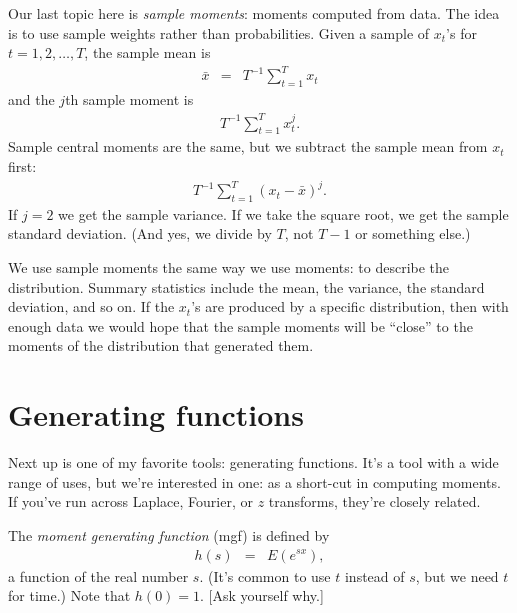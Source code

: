 Our last topic here is {\it sample moments\/}:
moments computed from data.
The idea is to use sample weights rather than probabilities.
Given a sample of $x_t$'s for $t=1,2,\ldots,T$,
the sample mean is
\begin{eqnarray*}
         \bar{x} &=& T^{-1} \sum_{t=1}^T x_t
\end{eqnarray*}
and the $j$th sample moment is
\begin{eqnarray*}
         T^{-1} \sum_{t=1}^T x_t^j .
\end{eqnarray*}
Sample central moments are the same, but we subtract the sample mean
from $x_t$ first:
\begin{eqnarray*}
         T^{-1} \sum_{t=1}^T (x_t-\bar{x})^j .
\end{eqnarray*}
If $j=2$ we get the sample variance.
If we take the square root, we get the sample standard deviation.
(And yes, we divide by $T$, not $T-1$ or something else.)

We use sample moments the same way we use moments:  to describe the distribution.
Summary statistics include the mean, the variance, the standard deviation,
and so on.
If the $x_t$'s are produced by a specific distribution,
then with enough data we would hope that the sample moments will be ``close''
to the moments of the distribution that generated them.


\section{Generating functions}

Next up is one of my favorite tools:  generating functions.
It's a tool with a wide range of uses,
but we're interested in one:
as a short-cut in computing moments.
If you've run across Laplace, {Fourier}, or $z$ transforms,
they're closely related.

The {\it moment generating function\/} (mgf) is defined by
\begin{eqnarray}
    h(s) &=& E \left( e^{s x} \right) ,
    \label{eq:def-mgf}
\end{eqnarray}
a function of the real number $s$.
(It's common to use $t$ instead of $s$, but we need $t$ for time.)
Note that $h(0) = 1$.
[Ask yourself why.]

